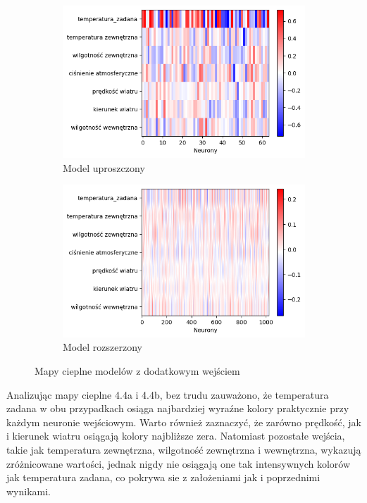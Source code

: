 \documentclass[a4paper,twoside,12pt]{book}
\begin{document}
\begin{figure}[!h]
  \centering
  \begin{subfigure}{0.49\textwidth}
    \includegraphics[width=\textwidth]{img/heatmap1_zdodatkowym.png}
    \caption{Model uproszczony}
    \label{fig:lewy-gorny}
  \end{subfigure}
  \hfill
  \begin{subfigure}{0.49\textwidth}
    \includegraphics[width=\textwidth]{img/heatmap2_zdodatkowym.png}
    \caption{Model rozszerzony}
    \label{fig:prawy-gorny}
  \end{subfigure}
  \caption{Mapy cieplne modelów z dodatkowym wejściem}
  \label{fig:wiele-rysunkow}
\end{figure}
Analizując mapy cieplne 4.4a i 4.4b, bez trudu zauważono, że temperatura zadana w obu przypadkach osiąga najbardziej wyraźne kolory praktycznie przy każdym neuronie wejściowym. Warto również zaznaczyć, że zarówno prędkość, jak i kierunek wiatru osiągają kolory najbliższe zera. Natomiast pozostałe wejścia, takie jak temperatura zewnętrzna, wilgotność zewnętrzna i wewnętrzna, wykazują zróżnicowane wartości, jednak nigdy nie osiągają one tak intensywnych kolorów jak temperatura zadana, co pokrywa sie z założeniami jak i poprzednimi wynikami.
\end{document}
